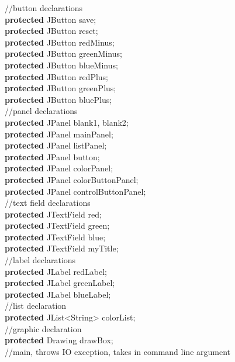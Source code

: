 \documentclass[12pt]{article}
\begin{document}
\begin{flushleft}
{\qquad		//button declarations\\
\qquad		\textbf{protected} JButton save;\\
\qquad		\textbf{protected} JButton reset;\\
\qquad		\textbf{protected} JButton redMinus;\\
\qquad		\textbf{protected} JButton greenMinus;\\
\qquad		\textbf{protected} JButton blueMinus;\\
\qquad		\textbf{protected} JButton redPlus;\\
\qquad		\textbf{protected} JButton greenPlus;\\
\qquad		\textbf{protected} JButton bluePlus;\\
			[2mm]
\qquad		//panel declarations\\   
\qquad		\textbf{protected} JPanel blank1, blank2;\\
\qquad		\textbf{protected} JPanel mainPanel;\\
\qquad		\textbf{protected} JPanel listPanel;\\
\qquad		\textbf{protected} JPanel button;\\
\qquad		\textbf{protected} JPanel colorPanel;\\
\qquad		\textbf{protected} JPanel colorButtonPanel;\\
\qquad		\textbf{protected} JPanel controlButtonPanel;\\
			[2mm]
\qquad		//text field declarations\\
\qquad		\textbf{protected} JTextField red;\\
\qquad		\textbf{protected} JTextField green;\\
\qquad		\textbf{protected} JTextField blue;\\
\qquad		\textbf{protected} JTextField myTitle;\\
			[2mm]
\qquad		//label declarations\\
\qquad		\textbf{protected} JLabel redLabel;\\
\qquad		\textbf{protected} JLabel greenLabel;\\
\qquad		\textbf{protected} JLabel blueLabel;\\
			[2mm]
\qquad		//list declaration\\
\qquad		\textbf{protected} JList<String> colorList;\\
			[2mm]
\qquad		//graphic declaration\\
\qquad		\textbf{protected} Drawing drawBox;\\
			[2mm]
\qquad		//main, throws IO exception, takes in command line argument\\
}
\end{flushleft}
\end{document}
